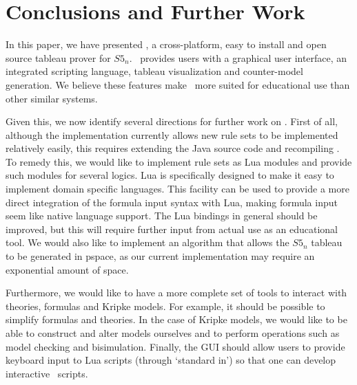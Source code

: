 \section{Conclusions and Further Work}
\label{sec:discussion}

In this paper, we have presented \oops, a cross-platform, easy to install and
open source tableau prover for $S5_n$.
\oops\ provides users with a graphical user interface, an integrated scripting
language, tableau visualization and counter-model generation. 
We believe these features make \oops\ more suited for educational use than
other similar systems.

Given this, we now identify several directions for further work on \oops.
First of all, although the implementation currently allows new rule sets to be
implemented relatively easily, this requires extending the Java source code and
recompiling \oops.
To remedy this, we would like to implement rule sets as Lua modules and provide such modules for several logics.
Lua is specifically designed to make it easy to implement domain specific languages.
This facility can be used to provide a more direct integration of the formula input syntax with Lua, making formula input seem like native language support.
The Lua bindings in general should be improved, but this will require further input from actual use as an educational tool.
We would also like to implement an algorithm that allows the $S5_n$ tableau to be generated in {\sc pspace}, as our current implementation may require an exponential amount of space.

Furthermore, we would like to have a more complete set of tools to interact with theories, formulas and Kripke models.
For example, it should be possible to simplify formulas and theories.
In the case of Kripke models, we would like to be able to construct and alter models ourselves and to perform operations such as model checking and bisimulation.
Finally, the GUI should allow users to provide keyboard input to Lua scripts (through `standard in') so that one can develop interactive \oops\ scripts.

